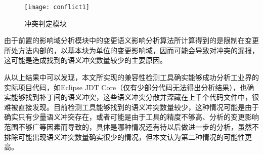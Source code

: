%

\begin{figure}[H]
	\centering
	\texttt{[image: conflict1]}
	\caption {冲突判定模块}
	\label {conflict_data}	
\end{figure}


%

由于前置的影响域分析模块中的变更语义影响分析算法所计算得到的是限制在变更所处方法内部的，以基本块为单位的变更影响域，因而可能会导致对冲突的漏报，这可能是造成找到的语义冲突数量较少的主要原因。

从以上结果中可以发现，本文所实现的兼容性检测工具确实能够成功分析工业界的实际项目代码，如Eclipse JDT Core（仅有少部分代码无法得出分析结果），也确实能够找到补丁间的语义冲突，这些语义冲突分散并深藏在上千个代码文件中，很难被直接发现。目前检测工具能够找到的语义冲突数量较少，这种情况可能是由于确实只有少量语义冲突存在，或者可能是由于工具的精度不够高、分析的变更影响范围不够广等因素而导致的，具体是哪种情况还有待以后做进一步的分析，虽然不排除可能出现语义冲突数量确实很少的情况，但本文认为第二种情况的可能性更高。
%		

